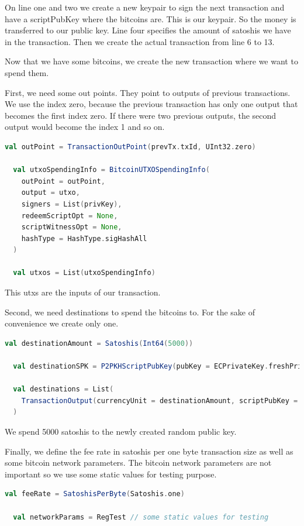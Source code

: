 On line one and two we create a new keypair to sign the next transaction and have a scriptPubKey where the bitcoins are.
This is our keypair.
So the money is transferred to our public key.
Line four specifies the amount of satoshis we have in the transaction.
Then we create the actual transaction from line 6 to 13.

Now that we have some bitcoins, we create the new transaction where we want to spend them.

First, we need some out points.
They point to outputs of previous transactions.
We use the index zero, because the previous transaction has only one output that becomes the first index zero.
If there were two previous outputs, the second output would become the index 1 and so on.
\begin{lstlisting}[language=scala]
  val outPoint = TransactionOutPoint(prevTx.txId, UInt32.zero)

  val utxoSpendingInfo = BitcoinUTXOSpendingInfo(
    outPoint = outPoint,
    output = utxo,
    signers = List(privKey),
    redeemScriptOpt = None,
    scriptWitnessOpt = None,
    hashType = HashType.sigHashAll
  )

  val utxos = List(utxoSpendingInfo)
\end{lstlisting}

This utxs are the inputs of our transaction.

Second, we need destinations to spend the bitcoins to.
For the sake of convenience we create only one.
\begin{lstlisting}[language=scala]
  val destinationAmount = Satoshis(Int64(5000))

  val destinationSPK = P2PKHScriptPubKey(pubKey = ECPrivateKey.freshPrivateKey.publicKey)

  val destinations = List(
    TransactionOutput(currencyUnit = destinationAmount, scriptPubKey = destinationSPK)
  )
\end{lstlisting}

We spend 5000 satoshis to the newly created random public key.

Finally, we define the fee rate in satoshis per one byte transaction size as well as some bitcoin network parameters.
The bitcoin network parameters are not important so we use some static values for testing purpose.
\begin{lstlisting}[language=scala]
  val feeRate = SatoshisPerByte(Satoshis.one)

  val networkParams = RegTest // some static values for testing
\end{lstlisting}

